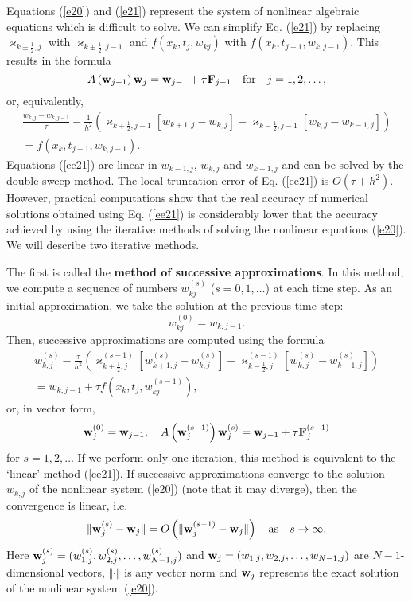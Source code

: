 Equations (\ref{e20}) and (\ref{e21}) represent
the system of nonlinear algebraic equations which is difficult to solve.
We can simplify Eq. (\ref{e21}) by replacing $\varkappa_{k\pm \frac{1}{2},j}$ with
$\varkappa_{k\pm \frac{1}{2},j-1}$ and $f(x_{k},t_{j},w_{kj})$ with
$f(x_{k},t_{j-1},w_{k,j-1})$. This results in the formula
\[
A\left({\bf w}_{j-1}\right){\bf w}_{j}={\bf w}_{j-1}+\tau {\bf F}_{j-1} \quad \hbox{for} \quad j=1,2,\dots,
\]
or, equivalently,
\begin{multline}
\frac{w_{k,j}-w_{k,j-1}}{\tau}- \frac{1}{h^2}
\left(\varkappa_{k+\frac{1}{2},j-1}\left[w_{k+1,j}-w_{k,j}\right]-
\varkappa_{k-\frac{1}{2},j-1}\left[w_{k,j}-w_{k-1,j}\right]\right)
\\=f(x_{k},t_{j-1},w_{k,j-1}).\label{ee21}
\end{multline}
Equations (\ref{ee21}) are linear in $w_{k-1,j}$, $w_{k,j}$ and $w_{k+1,j}$
and can be solved by the double-sweep method. The local truncation error
of Eq. (\ref{ee21}) is $O(\tau+h^2)$. However, practical computations show that the
real accuracy of numerical solutions obtained using Eq. (\ref{ee21}) is
considerably lower that the accuracy achieved by using
the iterative methods of solving the nonlinear equations (\ref{e20}).
We will describe two iterative methods.

  
 
The first is called the \textbf{method of successive approximations}. In this method,
we compute a sequence of numbers $w_{kj}^{(s)}$ ($s=0,1,\dots$) at each time step.
As an initial approximation, we take the solution at the previous time step:
\[
w_{kj}^{(0)}=w_{k,j-1}.
\]
Then, successive approximations are computed using the formula
\begin{multline}
w_{k,j}^{(s)}-
\frac{\tau}{h^2}
\left(\varkappa_{k+\frac{1}{2},j}^{(s-1)}\left[w_{k+1,j}^{(s)}-w_{k,j}^{(s)}\right]-
\varkappa_{k-\frac{1}{2},j}^{(s-1)}\left[w_{k,j}^{(s)}-w_{k-1,j}^{(s)}\right]\right)
\\=w_{k,j-1}+\tau f(x_{k},t_{j},w_{kj}^{(s-1)}), \label{e22}
\end{multline}
or, in vector form,
\[
{\bf w}_{j}^{(0)}={\bf w}_{j-1}, \quad
A\left({\bf w}_{j}^{(s-1)}\right){\bf w}_{j}^{(s)}={\bf w}_{j-1}+\tau {\bf F}_{j}^{(s-1)}
\]
for $s=1,2,\dots$
If we perform only one iteration, this method is equivalent to the
`linear' method (\ref{ee21}). If successive approximations converge
to the solution $w_{k,j}$ of the nonlinear system (\ref{e20}) (note that it may diverge),
then the convergence is linear, i.e.
\[
\Vert {\bf w}_{j}^{(s)}-{\bf w}_{j}\Vert=O\left(\Vert {\bf w}_{j}^{(s-1)}-{\bf w}_{j}\Vert
\right) \quad {\rm as} \quad s\to\infty.
\]
Here ${\bf w}_{j}^{(s)}=(w_{1,j}^{(s)},w_{2,j}^{(s)},\dots ,w_{N-1,j}^{(s)})$ and
${\bf w}_{j}=(w_{1,j},w_{2,j},\dots ,w_{N-1,j})$ are $N-1$-dimensional vectors,
$\Vert \cdot \Vert$ is any vector norm and ${\bf w}_{j}$ represents the exact solution
of the nonlinear system (\ref{e20}).

